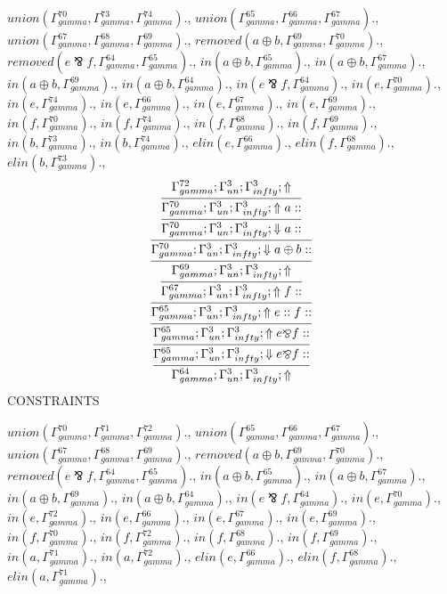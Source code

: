 \documentclass[a4paper, 11pt]{article}
\begin{document}
$union(\Gamma_{gamma}^{70}, \Gamma_{gamma}^{73}, \Gamma_{gamma}^{74}).$, $union(\Gamma_{gamma}^{65}, \Gamma_{gamma}^{66}, \Gamma_{gamma}^{67}).$, $union(\Gamma_{gamma}^{67}, \Gamma_{gamma}^{68}, \Gamma_{gamma}^{69}).$, $removed(a \oplus b, \Gamma_{gamma}^{69}, \Gamma_{gamma}^{70}).$, $removed(e \bindnasrepma f, \Gamma_{gamma}^{64}, \Gamma_{gamma}^{65}).$, $in(a \oplus b, \Gamma_{gamma}^{65}).$, $in(a \oplus b, \Gamma_{gamma}^{67}).$, $in(a \oplus b, \Gamma_{gamma}^{69}).$, $in(a \oplus b, \Gamma_{gamma}^{64}).$, $in(e \bindnasrepma f, \Gamma_{gamma}^{64}).$, $in(e, \Gamma_{gamma}^{70}).$, $in(e, \Gamma_{gamma}^{74}).$, $in(e, \Gamma_{gamma}^{66}).$, $in(e, \Gamma_{gamma}^{67}).$, $in(e, \Gamma_{gamma}^{69}).$, $in(f, \Gamma_{gamma}^{70}).$, $in(f, \Gamma_{gamma}^{74}).$, $in(f, \Gamma_{gamma}^{68}).$, $in(f, \Gamma_{gamma}^{69}).$, $in(b, \Gamma_{gamma}^{73}).$, $in(b, \Gamma_{gamma}^{74}).$, $elin(e, \Gamma_{gamma}^{66}).$, $elin(f, \Gamma_{gamma}^{68}).$, $elin(b, \Gamma_{gamma}^{73}).$, 
{\small
\[
\infer{\Gamma_{ gamma}^{64} ; \Gamma_{un}^{3} ; \Gamma_{ infty}^{3} ;  \Uparrow }
{\infer{\Gamma_{ gamma}^{65} ; \Gamma_{un}^{3} ; \Gamma_{ infty}^{3} ;  \Downarrow e \bindnasrepma f :: }
{\infer{\Gamma_{ gamma}^{65} ; \Gamma_{un}^{3} ; \Gamma_{ infty}^{3} ;  \Uparrow e \bindnasrepma f :: }
{\infer{\Gamma_{ gamma}^{65} ; \Gamma_{un}^{3} ; \Gamma_{ infty}^{3} ;  \Uparrow e :: f :: }
{\infer{\Gamma_{ gamma}^{67} ; \Gamma_{un}^{3} ; \Gamma_{ infty}^{3} ;  \Uparrow f :: }
{\infer{\Gamma_{ gamma}^{69} ; \Gamma_{un}^{3} ; \Gamma_{ infty}^{3} ;  \Uparrow }
{\infer{\Gamma_{ gamma}^{70} ; \Gamma_{un}^{3} ; \Gamma_{ infty}^{3} ;  \Downarrow a \oplus b :: }
{\infer{\Gamma_{ gamma}^{70} ; \Gamma_{un}^{3} ; \Gamma_{ infty}^{3} ;  \Downarrow a :: }
{\infer{\Gamma_{ gamma}^{70} ; \Gamma_{un}^{3} ; \Gamma_{ infty}^{3} ;  \Uparrow a :: }
{\Gamma_{ gamma}^{72} ; \Gamma_{un}^{3} ; \Gamma_{ infty}^{3} ;  \Uparrow }}}}}}}}}
\]
}
CONSTRAINTS

$union(\Gamma_{gamma}^{70}, \Gamma_{gamma}^{71}, \Gamma_{gamma}^{72}).$, $union(\Gamma_{gamma}^{65}, \Gamma_{gamma}^{66}, \Gamma_{gamma}^{67}).$, $union(\Gamma_{gamma}^{67}, \Gamma_{gamma}^{68}, \Gamma_{gamma}^{69}).$, $removed(a \oplus b, \Gamma_{gamma}^{69}, \Gamma_{gamma}^{70}).$, $removed(e \bindnasrepma f, \Gamma_{gamma}^{64}, \Gamma_{gamma}^{65}).$, $in(a \oplus b, \Gamma_{gamma}^{65}).$, $in(a \oplus b, \Gamma_{gamma}^{67}).$, $in(a \oplus b, \Gamma_{gamma}^{69}).$, $in(a \oplus b, \Gamma_{gamma}^{64}).$, $in(e \bindnasrepma f, \Gamma_{gamma}^{64}).$, $in(e, \Gamma_{gamma}^{70}).$, $in(e, \Gamma_{gamma}^{72}).$, $in(e, \Gamma_{gamma}^{66}).$, $in(e, \Gamma_{gamma}^{67}).$, $in(e, \Gamma_{gamma}^{69}).$, $in(f, \Gamma_{gamma}^{70}).$, $in(f, \Gamma_{gamma}^{72}).$, $in(f, \Gamma_{gamma}^{68}).$, $in(f, \Gamma_{gamma}^{69}).$, $in(a, \Gamma_{gamma}^{71}).$, $in(a, \Gamma_{gamma}^{72}).$, $elin(e, \Gamma_{gamma}^{66}).$, $elin(f, \Gamma_{gamma}^{68}).$, $elin(a, \Gamma_{gamma}^{71}).$,
\end{document}

